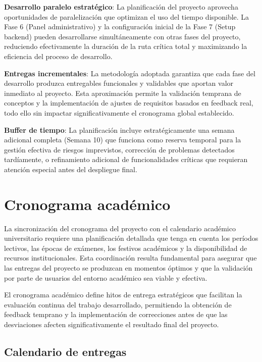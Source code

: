 \documentclass[12pt,a4paper,oneside]{report}
\begin{document}
\textbf{Desarrollo paralelo estratégico}: La planificación del proyecto aprovecha oportunidades de paralelización que optimizan el uso del tiempo disponible. La Fase 6 (Panel administrativo) y la configuración inicial de la Fase 7 (Setup backend) pueden desarrollarse simultáneamente con otras fases del proyecto, reduciendo efectivamente la duración de la ruta crítica total y maximizando la eficiencia del proceso de desarrollo.

\textbf{Entregas incrementales}: La metodología adoptada garantiza que cada fase del desarrollo produzca entregables funcionales y validables que aportan valor inmediato al proyecto. Esta aproximación permite la validación temprana de conceptos y la implementación de ajustes de requisitos basados en feedback real, todo ello sin impactar significativamente el cronograma global establecido.

\textbf{Buffer de tiempo}: La planificación incluye estratégicamente una semana adicional completa (Semana 10) que funciona como reserva temporal para la gestión efectiva de riesgos imprevistos, corrección de problemas detectados tardíamente, o refinamiento adicional de funcionalidades críticas que requieran atención especial antes del despliegue final.

\section{Cronograma académico}\label{cronograma-acaduxe9mico}

La sincronización del cronograma del proyecto con el calendario académico universitario requiere una planificación detallada que tenga en cuenta los períodos lectivos, las épocas de exámenes, los festivos académicos y la disponibilidad de recursos institucionales. Esta coordinación resulta fundamental para asegurar que las entregas del proyecto se produzcan en momentos óptimos y que la validación por parte de usuarios del entorno académico sea viable y efectiva.

El cronograma académico define hitos de entrega estratégicos que facilitan la evaluación continua del trabajo desarrollado, permitiendo la obtención de feedback temprano y la implementación de correcciones antes de que las desviaciones afecten significativamente el resultado final del proyecto.

\subsection{Calendario de entregas}\label{calendario-de-entregas}
\end{document}
